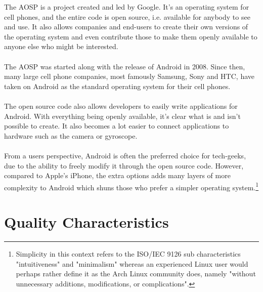\documentclass[conference]{IEEEtran}
\begin{document}
The AOSP is a project created and led by Google. It's an operating system for cell phones, and the entire code is open source, i.e. available for anybody to see and use. It also allows companies and end-users to create their own versions of the operating system and even contribute those to make them openly available to anyone else who might be interested.\cite{Android} 
\\\\The AOSP was started along with the release of Android in 2008. Since then, many large cell phone companies, most famously Samsung, Sony and HTC, have taken on Android as the standard operating system for their cell phones. 
\\\\The open source code also allows developers to easily write applications for Android. With everything being openly available, it's clear what is and isn't possible to create. It also becomes a lot easier to connect applications to hardware such as the camera or gyroscope.
\\\\From a users perspective, Android is often the preferred choice for tech-geeks, due to the ability to freely modify it through the open source code. However, compared to Apple's iPhone, the extra options adds many layers of more complexity to Android which shuns those who prefer a simpler operating system.\footnote{Simplicity in this context refers to the ISO/IEC 9126\cite{jung2004} sub characteristics "intuitiveness" and "minimalism" whereas an experienced Linux user would perhaps rather define it as the Arch Linux community does, namely "without unnecessary additions, modifications, or complications".\cite{archway}} 

\section{Quality Characteristics}
\label{quality}
\end{document}
